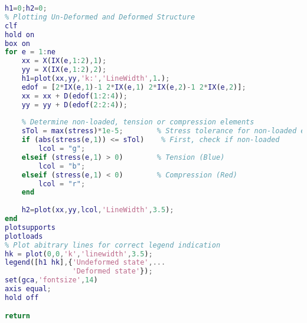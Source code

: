 \begin{lstlisting}[language=Matlab, caption = FE implementation for geometrical non-linearity, label=lst:CodeGNA]
h1=0;h2=0;
% Plotting Un-Deformed and Deformed Structure
clf
hold on
box on
for e = 1:ne
    xx = X(IX(e,1:2),1);
    yy = X(IX(e,1:2),2);
    h1=plot(xx,yy,'k:','LineWidth',1.);
    edof = [2*IX(e,1)-1 2*IX(e,1) 2*IX(e,2)-1 2*IX(e,2)];
    xx = xx + D(edof(1:2:4));
    yy = yy + D(edof(2:2:4));
    
    % Determine non-loaded, tension or compression elements
    sTol = max(stress)*1e-5;        % Stress tolerance for non-loaded elements
    if (abs(stress(e,1)) <= sTol)    % First, check if non-loaded
        lcol = "g";
    elseif (stress(e,1) > 0)        % Tension (Blue)
        lcol = "b";   
    elseif (stress(e,1) < 0)        % Compression (Red)
        lcol = "r"; 
    end  
    
    h2=plot(xx,yy,lcol,'LineWidth',3.5);    
end
plotsupports
plotloads
% Plot abitrary lines for correct legend indication
hk = plot(0,0,'k','linewidth',3.5);
legend([h1 hk],{'Undeformed state',...
                'Deformed state'});
set(gca,'fontsize',14)
axis equal;
hold off

return
\end{lstlisting}

